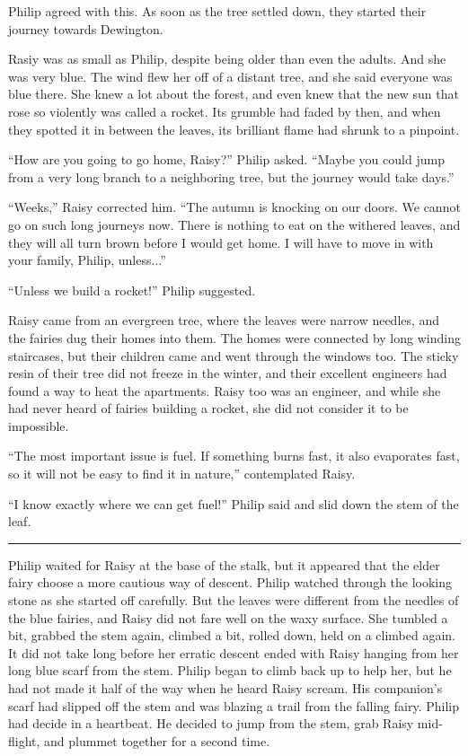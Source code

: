 \documentclass[10pt, draft]{memoir}
\renewcommand{\pfbreakdisplay}{\bigskip \ding{166} \bigskip}
\newcommand{\secbreak}{\fancybreak{\pfbreakdisplay}}
\begin{document}
Philip agreed with this. As soon as the tree settled down, they started their journey towards Dewington.

Rasiy was as small as Philip, despite being older than even the adults. And she was very blue. The wind flew her off of a distant tree, and she said everyone was blue there. She knew a lot about the forest, and even knew that the new sun that rose so violently was called a rocket. Its grumble had faded by then, and when they spotted it in between the leaves, its brilliant flame had shrunk to a pinpoint.

``How are you going to go home, Raisy?'' Philip asked. ``Maybe you could jump from a very long branch to a neighboring tree, but the journey would take days.”

``Weeks,'' Raisy corrected him. ``The autumn is knocking on our doors. We cannot go on such long journeys now. There is nothing to eat on the withered leaves, and they will all turn brown before I would get home. I will have to move in with your family, Philip, unless...''

``Unless we build a rocket!'' Philip suggested.

Raisy came from an evergreen tree, where the leaves were narrow needles, and the fairies dug their homes into them. The homes were connected by long winding staircases, but their children came and went through the windows too. The sticky resin of their tree did not freeze in the winter, and their excellent engineers had found a way to heat the apartments. Raisy too was an engineer, and while she had never heard of fairies building a rocket, she did not consider it to be impossible.

``The most important issue is fuel. If something burns fast, it also evaporates fast, so it will not be easy to find it in nature,'' contemplated Raisy.

``I know exactly where we can get fuel!'' Philip said and slid down the stem of the leaf.

\secbreak

Philip waited for Raisy at the base of the stalk, but it appeared that the elder fairy choose a more cautious way of descent. Philip watched through the looking stone as she started off carefully. But the leaves were different from the needles of the blue fairies, and Raisy did not fare well on the waxy surface. She tumbled a bit, grabbed the stem again, climbed a bit, rolled down, held on a climbed again. It did not take long before her erratic descent ended with Raisy hanging from her long blue scarf from the stem. Philip began to climb back up to help her, but he had not made it half of the way when he heard Raisy scream. His companion's scarf had slipped off the stem and was blazing a trail from the falling fairy. Philip had decide in a heartbeat. He decided to jump from the stem, grab Raisy mid-flight, and plummet together for a second time.
\end{document}
